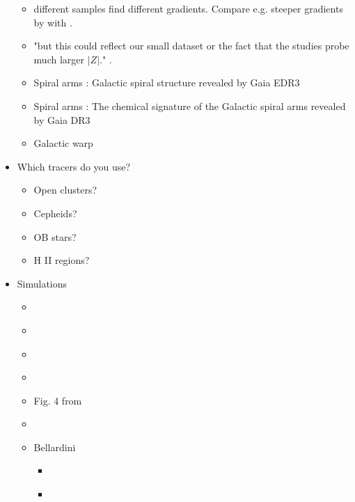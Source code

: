 \documentclass[fleqn,usenatbib]{mnras}
\begin{document}
\begin{itemize}
\begin{itemize}
        \item different samples find different gradients. Compare e.g. steeper gradients by \citet{Bergemann2014, Boeche2013} with \citet{AllendePrieto2006, Hayden2014, Anders2014, Katz2011}.
        \item "but this could reflect our small dataset or the fact that the studies probe much larger $\vert Z \vert$." \citep{Bergemann2014}.
        \item Spiral arms \citet{Poggio2021}: Galactic spiral structure revealed by Gaia EDR3
        \item Spiral arms \citet{Poggio2022}: The chemical signature of the Galactic spiral arms revealed by Gaia DR3
        \item Galactic warp \citep[e.g.][]{Lemasle2022}
    \end{itemize}
    \item Which tracers do you use?
    \begin{itemize}
        \item Open clusters?
        \item Cepheids? \citep{Andrievsky2002, Andrievsky2002b, Lemasle2007, Lemasle2013}
        \item OB stars?
        \item H II regions?
    \end{itemize}
    \item Simulations
    \begin{itemize}
        \item \citet{Minchev2014b}
        \item \citep[Figs. 7 and 9 from][]{Agertz2021}
        \item \citep[Figs. 6 and 9 from][]{Ma2017} %
        \item \citep[Fig. 1 from][]{Pilkington2012} %
        \item Fig. 4 from \citet{Tissera2019} %
        \item \cite{Brook2012} %
        \item Bellardini
        \begin{itemize}
            \item \cite{Bellardini2021}
            \item \citet{Bellardini2022}

\end{itemize}
\end{itemize}
\end{itemize}
\end{document}

